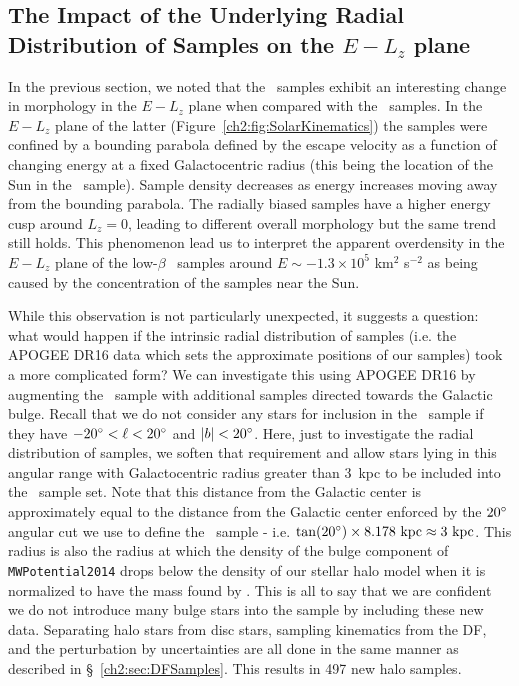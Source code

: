 \subsection{The Impact of the Underlying Radial Distribution of Samples on the \texorpdfstring{$E-L_{z}$}{E-Lz} plane}
\label{ch2:subsec:RadialBiases}

In the previous section, we noted that the \survey\ samples exhibit an interesting change in morphology in the $E-L_{z}$ plane when compared with the \solar\ samples. In the $E-L_{z}$ plane of the latter (Figure~\ref{ch2:fig:SolarKinematics}) the samples were confined by a bounding parabola defined by the escape velocity as a function of changing energy at a fixed Galactocentric radius (this being the location of the Sun in the \solar\ sample). Sample density decreases as energy increases moving away from the bounding parabola. The radially biased samples have a higher energy cusp around $L_{z}=0$, leading to different overall morphology but the same trend still holds. This phenomenon lead us to interpret the apparent overdensity in the $E-L_{z}$ plane of the low-$\beta$ \survey\ samples around $E \sim -1.3\times10^{5}$ km$^{2}$ s$^{-2}$ as being caused by the concentration of the samples near the Sun.

While this observation is not particularly unexpected, it suggests a question: what would happen if the intrinsic radial distribution of samples (i.e. the APOGEE DR16 data which sets the approximate positions of our samples) took a more complicated form? We can investigate this using APOGEE DR16 by augmenting the \survey\ sample with additional samples directed towards the Galactic bulge. Recall that we do not consider any stars for inclusion in the \survey\ sample if they have $-20\hbox{$^\circ$} < \ell < 20\hbox{$^\circ$}$ and $|b| < 20\hbox{$^\circ$}$. Here, just to investigate the radial distribution of samples, we soften that requirement and allow stars lying in this angular range with Galactocentric radius greater than 3~kpc to be included into the \survey\ sample set. Note that this distance from the Galactic center is approximately equal to the distance from the Galactic center enforced by the $20\hbox{$^\circ$}$ angular cut we use to define the \survey\ sample - i.e. $\tan(20\hbox{$^\circ$}) \times 8.178~\mathrm{kpc} \approx 3~\mathrm{kpc}$. This radius is also the radius at which the density of the bulge component of \texttt{MWPotential2014} drops below the density of our stellar halo model when it is normalized to have the mass found by \textcite{mackereth20}. This is all to say that we are confident we do not introduce many bulge stars into the sample by including these new data. Separating halo stars from disc stars, sampling kinematics from the DF, and the perturbation by uncertainties are all done in the same manner as described in \S~\ref{ch2:sec:DFSamples}. This results in 497 new halo samples.


